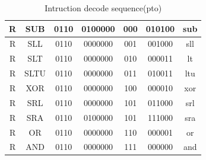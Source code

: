 \documentclass[12pt,a4paper]{report}
\begin{document}
\begin{table}[!ht]
\begin{tabular}{|c|c|c|c|c|c|c|}
R                                                              & SUB                & 0110  & 0100000 & 000    & 010100 & sub          \\ \hline
R                                                              & SLL                & 0110  & 0000000 & 001    & 001000 & sll          \\ \hline
R                                                              & SLT                & 0110  & 0000000 & 010    & 000011 & lt           \\ \hline
R                                                              & SLTU               & 0110  & 0000000 & 011    & 010011 & ltu          \\ \hline
R                                                              & XOR                & 0110  & 0000000 & 100    & 000010 & xor          \\ \hline
R                                                              & SRL                & 0110  & 0000000 & 101    & 011000 & srl          \\ \hline
R                                                              & SRA                & 0110  & 0100000 & 101    & 111000 & sra          \\ \hline
R                                                              & OR                 & 0110  & 0000000 & 110    & 000001 & or           \\ \hline
R                                                              & AND                & 0110  & 0000000 & 111    & 000000 & and          \\ \hline
\end{tabular}
\caption{Intruction decode sequence(pto)}
\label{tab:aluctl(a)}
\end{table}                                                         
\end{document}
